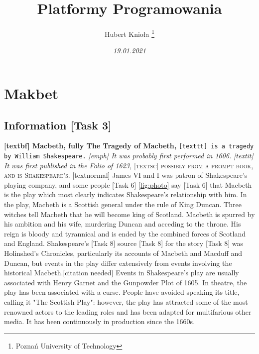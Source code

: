 \documentclass[12pt]{article}
\title{\Huge{\textbf{Platformy Programowania}}}
\author{Hubert Knioła \thanks{Poznań University of Technology}}
\date{\textit{19.01.2021}}
\begin{document}
\begin{titlepage}
\maketitle
\end{titlepage}

\tableofcontents

\newpage
\section{Makbet}
\subsection{Information [Task 3]}
\textbf{[textbf] Macbeth, fully The Tragedy of Macbeth,} 
\newline
\texttt{[texttt] is a tragedy by William Shakespeare.}
\newline
\emph{[emph] It was probably first performed in 1606.}
\newline
\textit{[textit] It was first published in the Folio of 1623,}
\newline
\textsc{[textsc] possibly from a prompt book, and is Shakespeare's.}
\newline
\textnormal{[textnormal] James VI and I  was  patron of Shakespeare's playing company,}
\newline
and some people [Task 6] \ref{fig:photo} say [Task 6] \pageref{tab:1} that Macbeth is the play which most clearly indicates Shakespeare's relationship with him. In the play, Macbeth is a Scottish general under the rule of King Duncan. Three witches tell Macbeth that he will become king of Scotland. Macbeth is spurred by his ambition and his wife, murdering Duncan and acceding to the throne. His reign is bloody and tyrannical and is ended by the combined forces of Scotland and England.
\newline
Shakespeare's [Task 8] \cite{firstbib} source  [Task 8] \cite{secondbib} for the story  [Task 8] \cite{thirdbib} was Holinshed's Chronicles, particularly its accounts of Macbeth and Macduff and Duncan, but events in the play differ extensively from events involving the historical Macbeth.[citation needed] Events in Shakespeare's play are usually associated with Henry Garnet and the Gunpowder Plot of 1605. In theatre, the play has been associated with a curse. People have avoided speaking its title, calling it "The Scottish Play": however, the play has attracted some of the most renowned actors to the leading roles and has been adapted for multifarious other media. It has been continuously in production since the 1660s.
\end{document}
